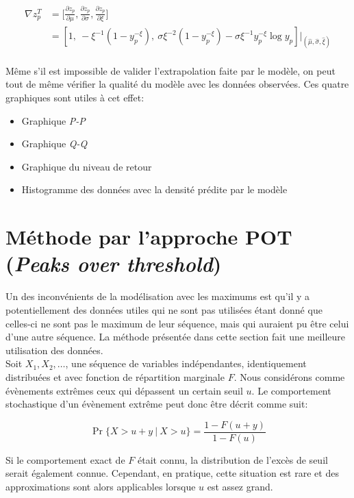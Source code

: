 \documentclass[11pt]{report}
\numberwithin{equation}{section}
\begin{document}
\begin{equation}\label{eq:1.1.10}
\begin{split}
\nabla z_p^T &= \Big[ \frac{\partial z_p}{\partial \mu}, \frac{\partial z_p}{\partial \sigma}, \frac{\partial z_p}{\partial \xi}\Big] \\
&= [1,\ -\xi^{-1}(1-y_p^{-\xi}),\ \sigma\xi^{-2}(1-y_p^{-\xi}) - \sigma\xi^{-1}y_p^{-\xi}\log y_p]\Bigg|_{(\hat\mu, \hat\sigma, \hat\xi)}
\end{split}
\end{equation}
\\

Même s'il est impossible de valider l'extrapolation faite par le modèle, on peut tout de même vérifier la qualité du modèle avec les données observées. Ces quatre graphiques sont utiles à cet effet:
\begin{itemize}
\item Graphique \textit{P-P}
\item Graphique \textit{Q-Q}
\item Graphique du niveau de retour
\item Histogramme des données avec la densité prédite par le modèle 
\end{itemize}


\section{Méthode par l'approche POT (\textit{Peaks over threshold})}

Un des inconvénients de la modélisation avec les maximums est qu'il y a potentiellement des données utiles qui ne sont pas utilisées étant donné que celles-ci ne sont pas le maximum de leur séquence, mais qui auraient pu être celui d'une autre séquence. La méthode présentée dans cette section fait une meilleure utilisation des données.\\

Soit $X_1, X_2,\dots$, une séquence de variables indépendantes, identiquement distribuées et avec fonction de répartition marginale $F$. Nous considérons comme évènements extrêmes ceux qui dépassent un certain seuil $u$. Le comportement stochastique d'un évènement extrême peut donc être décrit comme suit:

\begin{equation}\label{eq:1.2.1}
{\Pr{\{ X>u+y\ |\ X>u \}} = \frac{1-F(u+y)}{1- F(u)}}
\end{equation}

Si le comportement exact de $F$ était connu, la distribution de l'excès de seuil serait également connue. Cependant, en pratique, cette situation est rare et des approximations sont alors applicables lorsque $u$ est assez grand. \\
\end{document}
